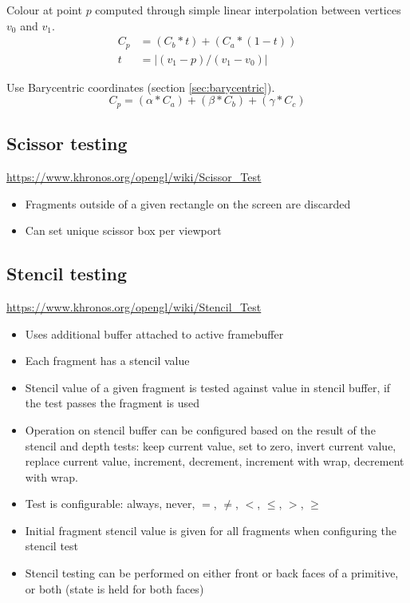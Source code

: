 \documentclass[a4paper]{article}
\begin{document}

Colour at point $p$ computed through simple linear interpolation between
vertices $v_{0}$ and $v_{1}$.
\begin{align*}
  C_{p} &= (C_{b} * t) + (C_{a} * (1 - t)) \\
  t &= |(v_{1} - p) / (v_{1} - v_{0})|
\end{align*}


Use Barycentric coordinates (section \ref{sec:barycentric}).
\[
  C_{p} = (\alpha * C_{a}) + (\beta * C_{b}) + (\gamma * C_{c})
\]

\subsection{Scissor testing}

\url{https://www.khronos.org/opengl/wiki/Scissor_Test}

\begin{itemize}
  \item
    Fragments outside of a given rectangle on the screen are discarded

  \item
    Can set unique scissor box per viewport
\end{itemize}

\subsection{Stencil testing}

\url{https://www.khronos.org/opengl/wiki/Stencil_Test}

\begin{itemize}
  \item
    Uses additional buffer attached to active framebuffer

  \item
    Each fragment has a stencil value

  \item
    Stencil value of a given fragment is tested against value in stencil buffer,
    if the test passes the fragment is used

  \item
    Operation on stencil buffer can be configured based on the result of the
    stencil and depth tests: keep current value, set to zero, invert current
    value, replace current value, increment, decrement, increment with wrap,
    decrement with wrap.

  \item
    Test is configurable: always, never, $=$, $\neq$, $<$, $\leq$, $>$, $\geq$

  \item
    Initial fragment stencil value is given for all fragments when configuring
    the stencil test

  \item
    Stencil testing can be performed on either front or back faces of a
    primitive, or both (state is held for both faces)

\end{itemize}
\end{document}
